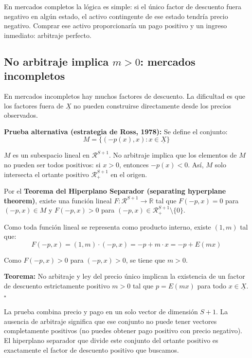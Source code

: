 \documentclass[12pt]{article}
\begin{document}
\begin{intuicion}
En mercados completos la l\'ogica es simple: si el \'unico factor de descuento fuera negativo en alg\'un estado, el activo contingente de ese estado tendr\'ia precio negativo. Comprar ese activo proporcionar\'ia un pago positivo y un ingreso inmediato: arbitraje perfecto.
\end{intuicion}

\subsection{No arbitraje implica $m > 0$: mercados incompletos}

En mercados incompletos hay muchos factores de descuento. La dificultad es que los factores fuera de $\underline{X}$ no pueden construirse directamente desde los precios observados.

\textbf{Prueba alternativa (estrategia de Ross, 1978):} Se define el conjunto:
\begin{equation}
    M = \{(-p(x), x) : x \in \underline{X}\}
\end{equation}

$M$ es un subespacio lineal en $\mathcal{R}^{S+1}$. No arbitraje implica que los elementos de $M$ no pueden ser todos positivos: si $x > 0$, entonces $-p(x) < 0$. As\'i, $M$ solo intersecta el ortante positivo $\mathcal{R}^{S+1}_+$ en el origen.

Por el \textbf{Teorema del Hiperplano Separador (separating hyperplane theorem)}, existe una funci\'on lineal $F: \mathcal{R}^{S+1} \to \mathbb{R}$ tal que $F(-p, x) = 0$ para $(-p,x) \in M$ y $F(-p,x) > 0$ para $(-p,x) \in \mathcal{R}^{S+1}_+ \setminus \{0\}$.

Como toda funci\'on lineal se representa como producto interno, existe $(1, m)$ tal que:
\begin{equation}
    F(-p, x) = (1, m) \cdot (-p, x) = -p + m \cdot x = -p + E(mx)
\end{equation}

Como $F(-p, x) > 0$ para $(-p, x) > 0$, se tiene que $m > 0$.

\textbf{Teorema:} No arbitraje y ley del precio \'unico implican la existencia de un factor de descuento estrictamente positivo $m > 0$ tal que $p = E(mx)$ para todo $x \in \underline{X}$. $\square$

\begin{intuicion}
La prueba combina precio y pago en un solo vector de dimensi\'on $S+1$. La ausencia de arbitraje significa que ese conjunto no puede tener vectores completamente positivos (no puedes obtener pago positivo con precio negativo). El hiperplano separador que divide este conjunto del ortante positivo es exactamente el factor de descuento positivo que buscamos.
\end{intuicion}
\end{document}
